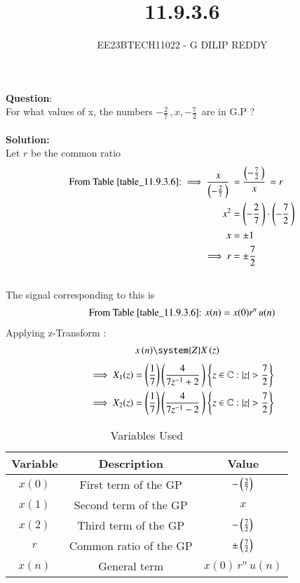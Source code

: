 \documentclass[journal,12pt,twocolumn]{IEEEtran}
\theoremstyle{remark}
\begin{document}

\vspace{3cm}

\title{11.9.3.6}
\author{EE23BTECH11022 - G DILIP REDDY}
\maketitle
\newpage

\bigskip

\renewcommand{\thefigure}{\theenumi}
\renewcommand{\thetable}{\theenumi}
\textbf{Question}:\\
For what values of x, the numbers $-\frac{2}{7}\,,x,-\frac{7}{2}\,$ are in G.P ?
\\\\
\textbf{Solution: }\\
Let $r$ be the common ratio\\
\begin{align}
\text{From \tabref{table_11.9.3.6}:}
\implies \frac{x}{\brak{-\frac{2}{7}\,}}\,&= \frac{\brak{-\frac{7}{2}\,}}{x}\,=r \\
x^2&=\brak{-\frac{2}{7}\,}\cdot\brak{-\frac{7}{2}\,}\\
x&=\pm 1\\
\implies r&=\pm \frac{7}{2}\,\\\notag
\end{align}
The signal corresponding to this is 
\begin{align}
\text{From \tabref{table_11.9.3.6}:}\,\,
x(n)=x(0)r^n\,u(n)
\end{align}
Applying z-Transform :
\begin{align}
	x \brak{n} & \system{Z} X \brak{z} \notag
\end{align}
\begin{align}
\implies X_1(z)&=\brak{\frac{1}{7}}\brak{\frac{4}{7z^{-1}+2}\,}
\cbrak{z\in\mathbb{C}: |z|>\frac{7}{2}}\\
\implies X_2(z)&=\brak{\frac{1}{7}}\brak{\frac{4}{7z^{-1}-2}\,}
\cbrak{z\in\mathbb{C}: |z|>\frac{7}{2}}
\end{align}
\begin{table}[h]
    \centering
    \renewcommand\thetable{1}
    \begin{tabular}[12.1pt]{ |c| c| c|}
    \hline
    \textbf{Variable} & \textbf{Description} &\textbf{Value}\\ 
    \hline
    $x(0)$ & First term of the GP &$-\left(\frac{2}{7}\right)$ \\
    \hline 
    $x(1)$ & Second term of the GP &$x$ \\
    \hline 
    $x(2)$ & Third term of the GP &$-\left(\frac{7}{2}\right)$ \\
    \hline 
    $r$ & Common ratio of the GP & $\pm \left(\frac{7}{2}\right)$ \\
    \hline
    $x(n)$ & General term & $x(0)\,r^n\,u(n)$\\
    \hline    
    \end{tabular}
    \caption{Variables Used}
    \label{table_11.9.3.6}
\end{table}
\end{document}
